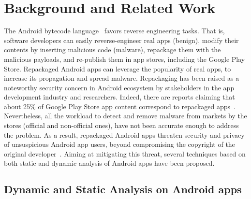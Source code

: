 \section{Background and Related Work}\label{sec:background}


The Android bytecode language~\cite{DBLP:conf/issta/WangGMC15} favors reverse engineering tasks. That is, software developers can easily reverse-engineer real apps (benign), modify their contents by inserting malicious code (malware), repackage them with the malicious payloads, and re-publish them in app stores, including the Google Play Store. Repackaged Android apps can leverage the popularity of real apps, to increase its propagation and spread malware.  
Repackaging has been raised as a noteworthy security concern in Android ecosystem by stakeholders in the app development industry and researchers. Indeed, there are reports claiming that about 25\% of Google Play Store app content correspond to repackaged apps~\cite{DBLP:conf/sigmetrics/ViennotGN14}. Nevertheless, all the workload to detect and remove malware from markets by the stores (official and non-official ones), have not been accurate enough to address the problem. As a result, repackaged Android apps threaten security and privacy of unsuspicious Android app users, beyond compromising the copyright of the original developer~\cite{DBLP:journals/access/KimLCP19}. Aiming at
mitigating this threat, several techniques based on both static and dynamic analysis of Android apps have been proposed.

\subsection{Dynamic and Static Analysis on Android apps}\label{sec:analysis}


